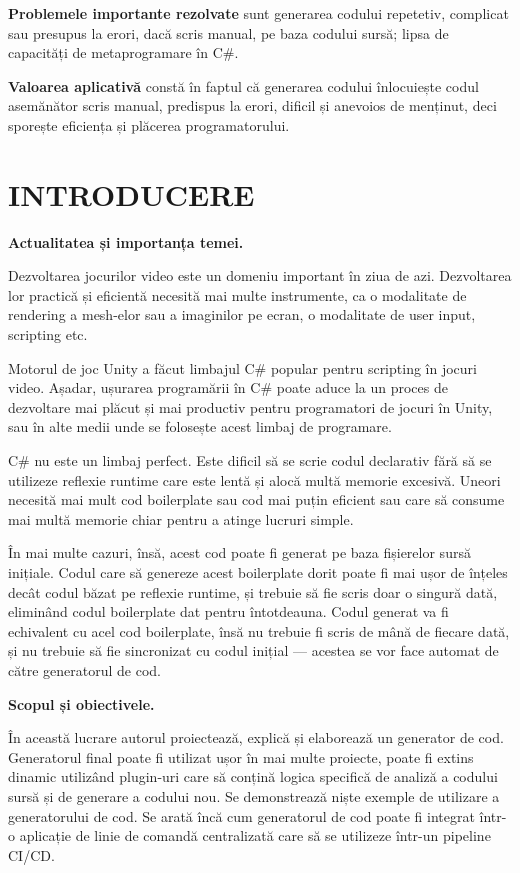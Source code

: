 \documentclass[a4paper,12pt]{report}
\def\oldchapter{} \let\oldchapter=\chapter{}
\def\chapter{\stepcounter{num_chapters}\oldchapter}
\newcommand{\unnumberedChapter}[1]{%
  \chapter*{#1}
  \addcontentsline{toc}{chapter}{#1}}
\begin{document}
\textbf{Problemele importante rezolvate} sunt generarea codului repetetiv, complicat sau presupus la erori, dacă scris manual, pe baza codului sursă; lipsa de capacități de metaprogramare în C\#.

\textbf{Valoarea aplicativă} constă în faptul că generarea codului înlocuiește codul asemănător scris manual, predispus la erori, dificil și anevoios de menținut, deci sporește eficiența și plăcerea programatorului.



\unnumberedChapter{INTRODUCERE}


\textbf{Actualitatea și importanța temei.}

Dezvoltarea jocurilor video este un domeniu important în ziua de azi.
Dezvoltarea lor practică și eficientă necesită mai multe instrumente, ca o modalitate de rendering a mesh-elor sau a imaginilor pe ecran, o modalitate de user input, scripting etc.

Motorul de joc Unity a făcut limbajul C\# popular pentru scripting în jocuri video.
Așadar, ușurarea programării în C\# poate aduce la un proces de dezvoltare mai plăcut și mai productiv pentru programatori de jocuri în Unity, sau în alte medii unde se folosește acest limbaj de programare.

C\# nu este un limbaj perfect.
Este dificil să se scrie codul declarativ fără să se utilizeze reflexie runtime care este lentă și alocă multă memorie excesivă.
Uneori necesită mai mult cod boilerplate sau cod mai puțin eficient sau care să consume mai multă memorie chiar pentru a atinge lucruri simple.

În mai multe cazuri, însă, acest cod poate fi generat pe baza fișierelor sursă inițiale.
Codul care să genereze acest boilerplate dorit poate fi mai ușor de înțeles decât codul băzat pe reflexie runtime, și trebuie să fie scris doar o singură dată, eliminând codul boilerplate dat pentru întotdeauna.
Codul generat va fi echivalent cu acel cod boilerplate, însă nu trebuie fi scris de mână de fiecare dată, și nu trebuie să fie sincronizat cu codul inițial — acestea se vor face automat de către generatorul de cod.


\textbf{Scopul și obiectivele.}

În această lucrare autorul proiectează, explică și elaborează un generator de cod.
Generatorul final poate fi utilizat ușor în mai multe proiecte, poate fi extins dinamic utilizând plugin-uri care să conțină logica specifică de analiză a codului sursă și de generare a codului nou.
Se demonstrează niște exemple de utilizare a generatorului de cod.
Se arată încă cum generatorul de cod poate fi integrat într-o aplicație de linie de comandă centralizată care să se utilizeze într-un pipeline \ac{CI/CD}.
\end{document}

